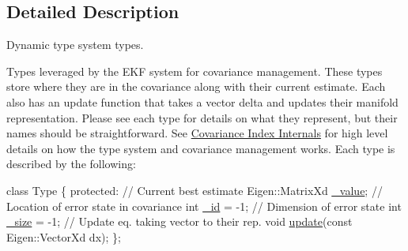 \subsection{Detailed Description}
Dynamic type system types. 

Types leveraged by the E\+KF system for covariance management. These types store where they are in the covariance along with their current estimate. Each also has an update function that takes a vector delta and updates their manifold representation. Please see each type for details on what they represent, but their names should be straightforward. See \hyperlink{dev-index}{Covariance Index Internals} for high level details on how the type system and covariance management works. Each type is described by the following\+:


\begin{DoxyCode}
\textcolor{keyword}{class }Type \{
\textcolor{keyword}{protected}:
  \textcolor{comment}{// Current best estimate}
  Eigen::MatrixXd \hyperlink{classov__type_1_1Type_a40afb4c94c3d11db860b98c186e22312}{\_value};
  \textcolor{comment}{// Location of error state in covariance}
  \textcolor{keywordtype}{int} \hyperlink{classov__type_1_1Type_adb644d3f30691886f153527a9782a1e0}{\_id} = -1;
  \textcolor{comment}{// Dimension of error state}
  \textcolor{keywordtype}{int} \hyperlink{classov__type_1_1Type_ae7450adb49403a591013e1719ab1e46e}{\_size} = -1;
  \textcolor{comment}{// Update eq. taking vector to their rep.}
  \textcolor{keywordtype}{void} \hyperlink{classov__type_1_1Type_a4e133d50af35f07bd97f73590fe31000}{update}(\textcolor{keyword}{const} Eigen::VectorXd dx);
\};
\end{DoxyCode}
 